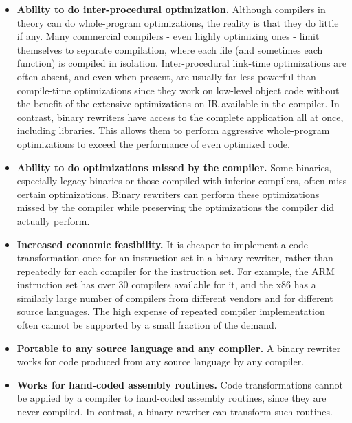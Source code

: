 \begin{itemize}

\item \textbf{Ability to do inter-procedural optimization.} Although compilers in theory can do
whole-program optimizations, the reality is that they do little if any. Many commercial compilers -
even highly optimizing ones - limit themselves to separate compilation, where each file (and
sometimes each function) is compiled in isolation. Inter-procedural link-time optimizations are
often absent, and even when present, are usually far less powerful than compile-time optimizations
since they work on low-level object code without the benefit of the extensive optimizations on IR
available in the compiler. In contrast, binary rewriters have access to the complete application all
at once, including libraries. This allows them to perform aggressive whole-program optimizations to
exceed the performance of even optimized code.

\item \textbf{Ability to do optimizations missed by the compiler.} Some binaries, especially legacy
binaries or those compiled with inferior compilers, often miss certain optimizations. Binary
rewriters can perform these optimizations missed by the compiler while preserving the optimizations
the compiler did actually perform.

\item \textbf{Increased economic feasibility.} It is cheaper to implement a code transformation once
for an instruction set in a binary rewriter, rather than repeatedly for each compiler for the
instruction set. For example, the ARM instruction set has over 30 compilers available for it, and
the x86 has a similarly large number of compilers from different vendors and for different source
languages. The high expense of repeated compiler implementation often cannot be supported by a small
fraction of the demand.

\item \textbf{Portable to any source language and any compiler.} A binary rewriter works for code
produced from any source language by any compiler. 

\item \textbf{Works for hand-coded assembly routines.} Code transformations cannot be applied by a
compiler to hand-coded assembly routines, since they are never compiled. In contrast, a binary
rewriter can transform such routines.

\end{itemize}

